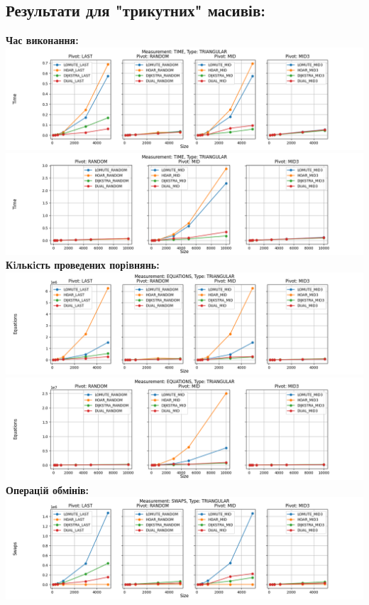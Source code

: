 \documentclass{article}
\begin{document}
    \subsection{Результати для "трикутних" масивів:}
    \textbf{Час виконання:}
    \newline
        \includegraphics[scale=0.5]{triangular_Time_6_numbers.png}
        \includegraphics[scale=0.5]{triangular_Time_3_pivots_7_numbers.png}
    \textbf{Кiлькiсть проведених порiвнянь:}
    \newline
        \includegraphics[scale=0.5]{triangular_Equations_6_numbers.png}
        \includegraphics[scale=0.5]{triangular_Equations_3_pivots_7_numbers.png}
        \newline
    \textbf{Операцiй обмінів:}
    \newline
        \includegraphics[scale=0.5]{triangular_Swaps_6_numbers.png}
\end{document}
